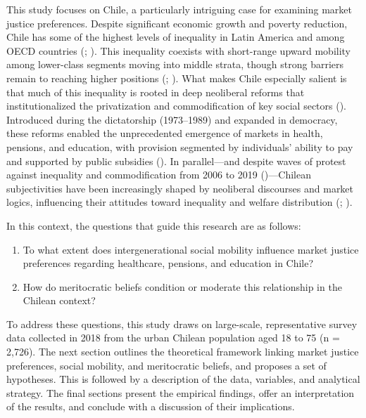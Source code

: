 \documentclass[
  12pt,
]{article}
\providecommand{\tightlist}{%
  \setlength{\itemsep}{0pt}\setlength{\parskip}{0pt}}\usepackage{longtable,booktabs,array}
\begin{document}
This study focuses on Chile, a particularly intriguing case for
examining market justice preferences. Despite significant economic
growth and poverty reduction, Chile has some of the highest levels of
inequality in Latin America and among OECD countries
(;
). This inequality
coexists with short-range upward mobility among lower-class segments
moving into middle strata, though strong barriers remain to reaching
higher positions (; ). What makes Chile especially salient is that much of this
inequality is rooted in deep neoliberal reforms that institutionalized
the privatization and commodification of key social sectors
(). Introduced
during the dictatorship (1973--1989) and expanded in democracy, these
reforms enabled the unprecedented emergence of markets in health,
pensions, and education, with provision segmented by individuals'
ability to pay and supported by public subsidies
(). In parallel---and
despite waves of protest against inequality and commodification from
2006 to 2019 ()---Chilean subjectivities have been increasingly shaped by
neoliberal discourses and market logics, influencing their attitudes
toward inequality and welfare distribution
(;
).

In this context, the questions that guide this research are as follows:

\begin{enumerate}
\def\labelenumi{(\arabic{enumi})}
\tightlist
\item
  To what extent does intergenerational social mobility influence market
  justice preferences regarding healthcare, pensions, and education in
  Chile?
\item
  How do meritocratic beliefs condition or moderate this relationship in
  the Chilean context?
\end{enumerate}

To address these questions, this study draws on large-scale,
representative survey data collected in 2018 from the urban Chilean
population aged 18 to 75 (n = 2,726). The next section outlines the
theoretical framework linking market justice preferences, social
mobility, and meritocratic beliefs, and proposes a set of hypotheses.
This is followed by a description of the data, variables, and analytical
strategy. The final sections present the empirical findings, offer an
interpretation of the results, and conclude with a discussion of their
implications.
\end{document}
